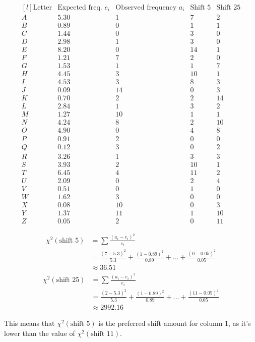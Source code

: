 \documentclass{article}
\begin{document}
	\[
	 \begin{matrix*}[l]
	 \text{Letter} & \text{Expected freq. } e_i & \text{Observed frequency } a_i & \text{Shift 5} & \text{Shift 25} \\
	A&5.30&1&7&2 \\
	B&0.89&0&1&1\\
	C&1.44&0&3&0\\
	D&2.98&1&3&0\\
	E&8.20&0&14&1\\
	F&1.21&7&2&0\\
	G&1.53&1&1&7\\
	H&4.45&3&10&1\\
	I&4.53&3&8&3\\
	J&0.09&14&0&3\\
	K&0.70&2&2&14\\
	L&2.84&1&3&2\\
	M&1.27&10&1&1\\
	N&4.24&8&2&10\\
	O&4.90&0&4&8\\
	P&0.91&2&0&0\\
	Q&0.12&3&0&2\\
	R&3.26&1&3&3\\
	S&3.93&2&10&1\\
	T&6.45&4&11&2\\
	U&2.09&0&2&4\\
	V&0.51&0&1&0\\
	W&1.62&3&0&0\\
	X&0.08&10&0&3\\
	Y&1.37&11&1&10\\
	Z&0.05&2&0&11
	\end{matrix*}
	\]
	
	\[
	\begin{split}
	\chi^2(\text{shift } 5) &=\sum\frac{(a_i-e_i)^2}{e_i}  \\
	&= \frac{(7-5.3)^2}{5.3} + \frac{(1-0.89)^2}{0.89} + ... + \frac{(0-0.05)^2}{0.05} \\
	&\approx 36.51
	\end{split}
	\]
	\[
	\begin{split}
	\chi^2(\text{shift } 25) &=\sum\frac{(a_i-e_i)^2}{e_i}  \\
	&= \frac{(2-5.3)^2}{5.3} + \frac{(1-0.89)^2}{0.89} + ... + \frac{(11-0.05)^2}{0.05} \\
	&\approx 2992.16
	\end{split}
	\]
	
	This means that $\chi^2(\text{shift } 5)$ is the preferred shift amount for column 1, as it's lower than the value of $\chi^2(\text{shift } 11)$.
	
\end{document}
